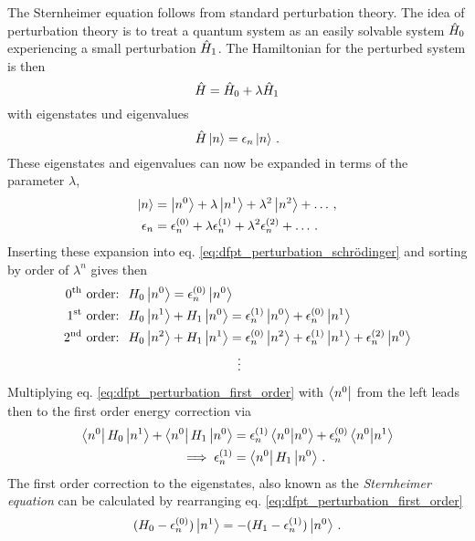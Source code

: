 \documentclass[main.tex]{subfiles}
\begin{document}
The Sternheimer equation follows from standard perturbation theory.
The idea of perturbation theory is to treat a quantum system as an easily solvable system \(\hat{H}_0\) experiencing a small perturbation \(\hat{H}_1\).
The Hamiltonian for the perturbed system is then
\begin{equation}
    \hat{H} = \hat{H}_0 + \lambda \hat{H}_1
\end{equation}
with eigenstates und eigenvalues
\begin{equation}\label{eq:dfpt_perturbation_schrödinger}
    \hat{H} \ket{n} = \epsilon_n \ket{n}\,.
\end{equation}
These eigenstates and eigenvalues can now be expanded in terms of the parameter \(\lambda\),
\begin{align}
    \ket{n} &= \ket{n^{0}} + \lambda \ket{n^{1}} + \lambda^2 \ket{n^{2}} + \ldots\,, \\
    \epsilon_n &= \epsilon_n^{(0)} + \lambda \epsilon_n^{(1)} + \lambda^2 \epsilon_n^{(2)} + \ldots\,.
\end{align}
Inserting these expansion into eq. \ref{eq:dfpt_perturbation_schrödinger} and sorting by order of \(\lambda^n\) gives then
\begin{align}
    \text{0\textsuperscript{th} order: }\; &H_0 \ket{n^{0}} = \epsilon_n^{(0)} \ket{n^{0}} \\ 
    \text{1\textsuperscript{st} order: }\; &H_0 \ket{n^{1}} + H_1 \ket{n^{0}} = \epsilon_n^{(1)} \ket{n^{0}} + \epsilon_n^{(0)} \ket{n^{1}} \label{eq:dfpt_perturbation_first_order} \\
    \text{2\textsuperscript{nd} order: }\; &H_0 \ket{n^{2}} + H_1 \ket{n^{1}} = \epsilon_n^{(0)} \ket{n^{2}} + \epsilon_n^{(1)} \ket{n^{1}} + \epsilon_n^{(2)} \ket{n^{0}} \\
    &\hspace{3cm} \vdots \nonumber
\end{align}
Multiplying eq. \ref{eq:dfpt_perturbation_first_order} with \(\bra{n^{0}}\) from the left leads then to the first order energy correction via
\begin{align}
    \bra{n^{0}} H_0 \ket{n^{1}} + \bra{n^{0}} H_1 \ket{n^{0}} &= \epsilon_n^{(1)} \bra{n^{0}} \ket{n^{0}} + \epsilon_n^{(0)} \bra{n^{0}} \ket{n^{1}} \\
    \implies \epsilon_n^{(1)} &= \bra{n^{0}} H_1 \ket{n^{0}}\,.
\end{align}
The first order correction to the eigenstates, also known as the \emph{Sternheimer equation} can be calculated by rearranging eq. \ref{eq:dfpt_perturbation_first_order}
\begin{equation}\label{eq:dfpt_sternheimer}
    (H_0 - \epsilon_n^{(0)}) \ket{n^1} = -(H_1 - \epsilon_n^{(1)}) \ket{n^0}\,.
\end{equation}
\end{document}
